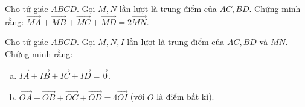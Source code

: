 \begin{bt}%
Cho tứ giác $ABCD$. Gọi $M,N$ lần lượt là trung điểm của $AC,BD$. Chứng minh rằng: $\vec {MA}  +  \vec {MB}  +  \vec {MC}  +  \vec {MD}=2\vec {MN}$.
\end{bt}

\begin{bt}%
Cho tứ giác $ABCD$. Gọi $M,N,I$ lần lượt là trung điểm của $AC,BD$ và $MN$. Chứng minh rằng: 
\begin{enumerate}[a)]
\item $\vec {IA}  +  \vec {IB}  +  \vec {IC}  +  \vec {ID}=\vec {0}$.
\item $\vec {OA}  +  \vec {OB}  +  \vec {OC}  +  \vec {OD}=4\vec {OI}$ (với $O$ là điểm bất kì).
\end{enumerate}


\end{bt}
